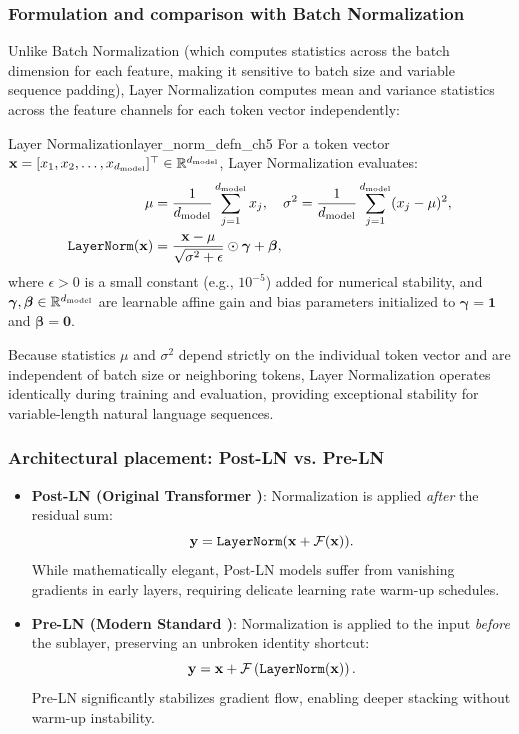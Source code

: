 \documentclass[../../../main.tex]{subfiles}
\begin{document}
\subsubsection{Formulation and comparison with Batch Normalization}
Unlike Batch Normalization (which computes statistics across the batch dimension for each feature, making it sensitive to batch size and variable sequence padding), Layer Normalization computes mean and variance statistics across the feature channels for each token vector independently:
\begin{definition}{Layer Normalization}{layer_norm_defn_ch5}
For a token vector $\mathbf{x} = [x_1, x_2, \dots, x_{d_{\text{model}}}]^\top \in \mathbb{R}^{d_{\text{model}}}$, Layer Normalization evaluates:
\begin{align}
\mu &= \frac{1}{d_{\text{model}}} \sum_{j=1}^{d_{\text{model}}} x_j, \quad \sigma^2 = \frac{1}{d_{\text{model}}} \sum_{j=1}^{d_{\text{model}}} (x_j - \mu)^2, \\
\label{eq:layer_norm_formula_ch5}
\text{\texttt{LayerNorm}}(\mathbf{x}) &= \frac{\mathbf{x} - \mu}{\sqrt{\sigma^2 + \epsilon}} \odot \boldsymbol{\gamma} + \boldsymbol{\beta},
\end{align}
where $\epsilon > 0$ is a small constant (e.g., $10^{-5}$) added for numerical stability, and $\boldsymbol{\gamma}, \boldsymbol{\beta} \in \mathbb{R}^{d_{\text{model}}}$ are learnable affine gain and bias parameters initialized to $\boldsymbol{\gamma} = \mathbf{1}$ and $\boldsymbol{\beta} = \mathbf{0}$.
\end{definition}

Because statistics $\mu$ and $\sigma^2$ depend strictly on the individual token vector and are independent of batch size or neighboring tokens, Layer Normalization operates identically during training and evaluation, providing exceptional stability for variable-length natural language sequences.

\subsubsection{Architectural placement: Post-LN vs. Pre-LN}
\begin{itemize}
    \item \textbf{Post-LN (Original Transformer \cite{vaswani2017})}: Normalization is applied \emph{after} the residual sum:
    \begin{equation}
    \mathbf{y} = \text{\texttt{LayerNorm}}(\mathbf{x} + \mathcal{F}(\mathbf{x})).
    \end{equation}
    While mathematically elegant, Post-LN models suffer from vanishing gradients in early layers, requiring delicate learning rate warm-up schedules.
    \item \textbf{Pre-LN (Modern Standard \cite{radford2019, touvron2023llama})}: Normalization is applied to the input \emph{before} the sublayer, preserving an unbroken identity shortcut:
    \begin{equation}
    \mathbf{y} = \mathbf{x} + \mathcal{F}\left( \text{\texttt{LayerNorm}}(\mathbf{x}) \right).
    \end{equation}
    Pre-LN significantly stabilizes gradient flow, enabling deeper stacking without warm-up instability.
\end{itemize}
\end{document}
